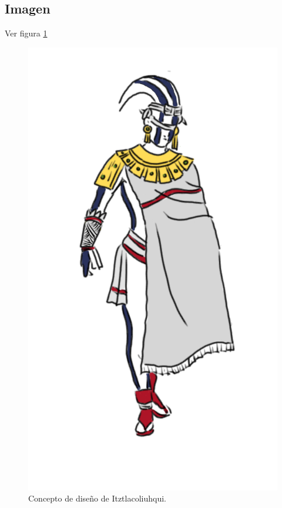 \subsection{Imagen}
Ver figura \ref{fig:diosCastigo}
	\begin{figure}
					\centering
					\includegraphics[height=0.3 \textheight]{Imagenes/diosCastigo}
					\caption{Concepto de diseño de Itztlacoliuhqui.}
					\label{fig:diosCastigo}
	\end{figure}
